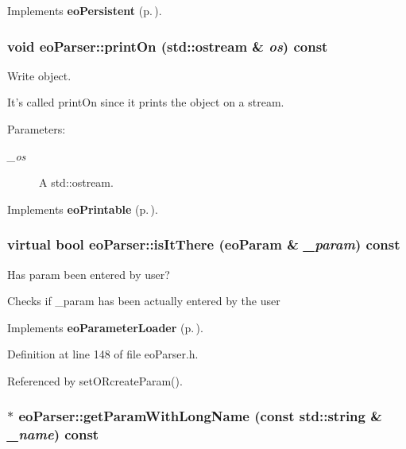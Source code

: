 Implements {\bf eo\-Persistent} {\rm (p.\,\pageref{classeo_persistent_a1})}.
\subsubsection{\setlength{\rightskip}{0pt plus 5cm}void eo\-Parser::print\-On (std::ostream \& {\em os}) const\hspace{0.3cm}{\tt  [virtual]}}\label{classeo_parser_a3}


Write object. 

It's called print\-On since it prints the object on a stream. \begin{Desc}
\item[Parameters:]
\begin{description}
\item[{\em \_\-os}]A std::ostream. \end{description}
\end{Desc}


Implements {\bf eo\-Printable} {\rm (p.\,\pageref{classeo_printable_a1})}.
\subsubsection{\setlength{\rightskip}{0pt plus 5cm}virtual bool eo\-Parser::is\-It\-There ({\bf eo\-Param} \& {\em \_\-param}) const\hspace{0.3cm}{\tt  [inline, virtual]}}\label{classeo_parser_a8}


Has param been entered by user? 

Checks if \_\-param has been actually entered by the user 

Implements {\bf eo\-Parameter\-Loader} {\rm (p.\,\pageref{classeo_parameter_loader_a2})}.

Definition at line 148 of file eo\-Parser.h.

Referenced by set\-ORcreate\-Param().
\subsubsection{$\ast$ eo\-Parser::get\-Param\-With\-Long\-Name (const std::string \& {\em \_\-name}) const}\label{classeo_parser_a9}



